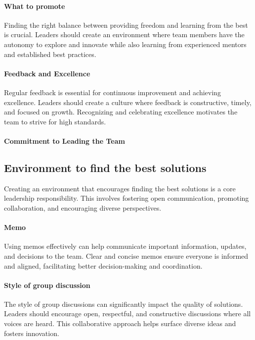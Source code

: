 \paragraph{What to promote}
Finding the right balance between providing freedom and learning from the best is crucial. Leaders should create an environment where team members have the autonomy to explore and innovate while also learning from experienced mentors and established best practices. 


\paragraph{Feedback and Excellence}
Regular feedback is essential for continuous improvement and achieving excellence. Leaders should create a culture where feedback is constructive, timely, and focused on growth. Recognizing and celebrating excellence motivates the team to strive for high standards.

\paragraph{Commitment to Leading the Team}

\subsection{Environment to find the best solutions}
Creating an environment that encourages finding the best solutions is a core leadership responsibility. This involves fostering open communication, promoting collaboration, and encouraging diverse perspectives.

\paragraph{Memo}
Using memos effectively can help communicate important information, updates, and decisions to the team. Clear and concise memos ensure everyone is informed and aligned, facilitating better decision-making and coordination.

\paragraph{Style of group discussion}
The style of group discussions can significantly impact the quality of solutions. Leaders should encourage open, respectful, and constructive discussions where all voices are heard. This collaborative approach helps surface diverse ideas and fosters innovation.

